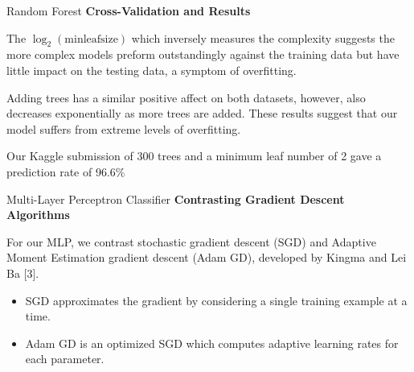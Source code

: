 \documentclass[titlepage,leqno]{beamer}%
\begin{document}
\begin{frame}[fragile]{Random Forest}
\textbf{Cross-Validation and Results}

The $\log_2(\text{minleafsize})$ which inversely measures the complexity suggests the more complex models preform outstandingly against the training data but have little impact on the testing data, a symptom of overfitting. 

\vspace{3.75mm}

Adding trees has a similar positive affect on both datasets, however, also decreases exponentially as more trees are added. These results suggest that our model suffers from extreme levels of overfitting.

\vspace{3.75mm}

Our Kaggle submission of 300 trees and a minimum leaf number of 2 gave a prediction rate of 96.6\%

\end{frame}
\begin{frame}{Multi-Layer Perceptron Classifier}
\textbf{Contrasting Gradient Descent Algorithms}

For our MLP, we contrast stochastic gradient descent (SGD) and Adaptive Moment Estimation gradient descent (Adam GD), developed by Kingma and Lei Ba [3]. 

\vspace{3.75mm}

\begin{itemize}
	\item SGD approximates the gradient by considering a single training example at a time.
	\item Adam GD is an optimized SGD which computes adaptive learning rates for each parameter.
\end{itemize}

\end{frame}
\end{document}
